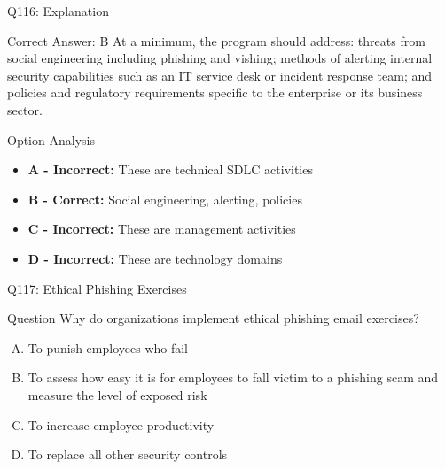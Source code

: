 \documentclass{beamer}
\begin{document}
	\begin{frame}{Q116: Explanation}
		\begin{block}{Correct Answer: B}
			At a minimum, the program should address: threats from social engineering including phishing and vishing; methods of alerting internal security capabilities such as an IT service desk or incident response team; and policies and regulatory requirements specific to the enterprise or its business sector.
		\end{block}
		\begin{block}{Option Analysis}
			\begin{itemize}
				\item \textbf{A - Incorrect:} These are technical SDLC activities
				\item \textbf{B - Correct:} Social engineering, alerting, policies
				\item \textbf{C - Incorrect:} These are management activities
				\item \textbf{D - Incorrect:} These are technology domains
			\end{itemize}
		\end{block}
	\end{frame}
	
	\begin{frame}{Q117: Ethical Phishing Exercises}
		\begin{block}{Question}
			Why do organizations implement ethical phishing email exercises?
		\end{block}
		\begin{enumerate}[(A)]
			\item To punish employees who fail
			\item To assess how easy it is for employees to fall victim to a phishing scam and measure the level of exposed risk
			\item To increase employee productivity
			\item To replace all other security controls
		\end{enumerate}
	\end{frame}
	
\end{document}
